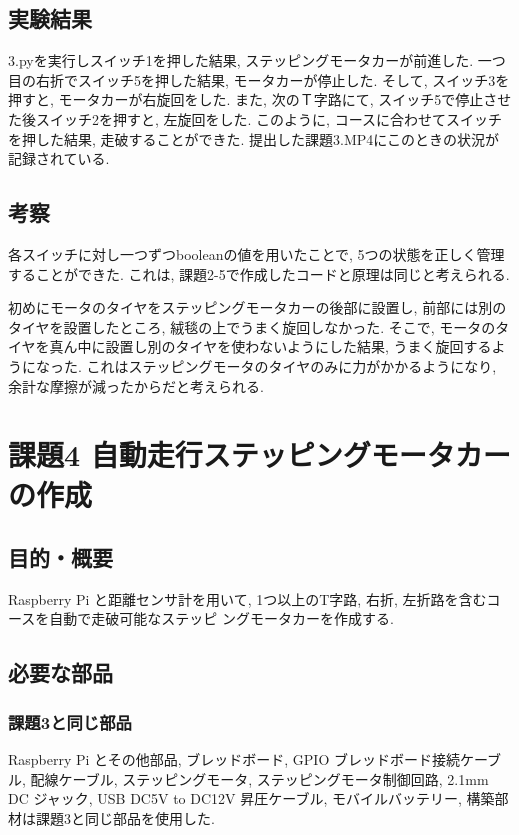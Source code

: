 \documentclass{ltjsarticle} %
\begin{document}
\subsection{実験結果}
3.pyを実行しスイッチ1を押した結果, ステッピングモータカーが前進した. 
一つ目の右折でスイッチ5を押した結果, モータカーが停止した. 
そして, スイッチ3を押すと, モータカーが右旋回をした. 
また, 次のＴ字路にて, スイッチ5で停止させた後スイッチ2を押すと, 左旋回をした. 
このように, コースに合わせてスイッチを押した結果, 走破することができた. 
提出した課題3.MP4にこのときの状況が記録されている. 


\subsection{考察}
各スイッチに対し一つずつbooleanの値を用いたことで, 5つの状態を正しく管理することができた. 
これは, 課題2-5で作成したコードと原理は同じと考えられる.  

初めにモータのタイヤをステッピングモータカーの後部に設置し, 前部には別のタイヤを設置したところ, 絨毯の上でうまく旋回しなかった. 
そこで, モータのタイヤを真ん中に設置し別のタイヤを使わないようにした結果, うまく旋回するようになった. 
これはステッピングモータのタイヤのみに力がかかるようになり, 余計な摩擦が減ったからだと考えられる. 
  


\section{課題4  ⾃動⾛⾏ステッピングモータカーの作成}

\subsection{目的・概要}
Raspberry Pi と距離センサ計を⽤いて, 1つ以上のT字路, 右折, 左折路を含むコースを⾃動で⾛破可能なステッピ
ングモータカーを作成する. 

\subsection{必要な部品}

\subsubsection{課題3と同じ部品}
Raspberry Pi とその他部品, ブレッドボード, GPIO ブレッドボード接続ケーブル, 配線ケーブル, 
ステッピングモータ, ステッピングモータ制御回路, 2.1mm DC ジャック, USB DC5V to DC12V 昇圧ケーブル, 
モバイルバッテリー, 構築部材は課題3と同じ部品を使用した. 
\end{document}
